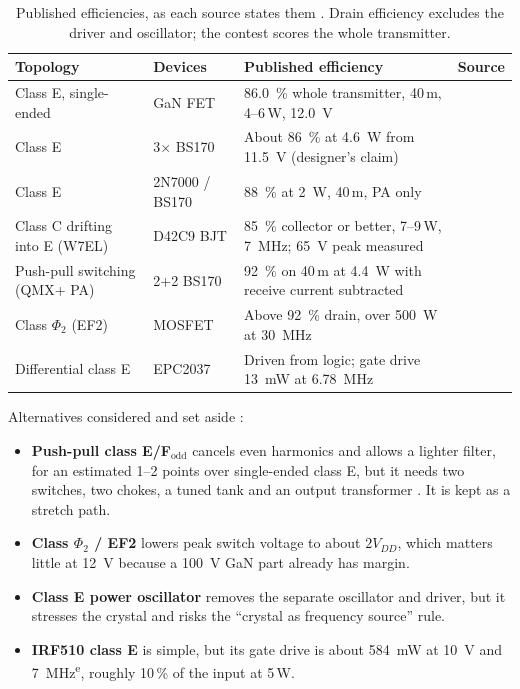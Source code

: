 \documentclass[11pt,letterpaper]{article}
\newcommand{\est}{\textsuperscript{e}}
\begin{document}
\begin{table}[h]
\centering\small
\caption{Published efficiencies, as each source states them \cite{projnotes}. Drain efficiency excludes the driver and oscillator; the contest scores the whole transmitter.}\label{tab:published}
\begin{tabularx}{\textwidth}{@{}L{3.1cm}L{2.4cm}YL{2.6cm}@{}}
\toprule
Topology & Devices & Published efficiency & Source \\ \midrule
Class E, single-ended & GaN FET & \SI{86.0}{\percent} whole transmitter, 40\,m, 4--6\,W, \SI{12.0}{\volt} & \cite{fdim2026winner} \\
Class E & 3$\times$ BS170 & About \SI{86}{\percent} at \SI{4.6}{\watt} from \SI{11.5}{\volt} (designer's claim) & \cite{sovina} \\
Class E & 2N7000 / BS170 & \SI{88}{\percent} at \SI{2}{\watt}, 40\,m, PA only & \cite{tayloe} \\
Class C drifting into E (W7EL) & D42C9 BJT & \SI{85}{\percent} collector or better, 7--9\,W, \SI{7}{\mega\hertz}; \SI{65}{\volt} peak measured & \cite[pp.~2.36, 2.37, 2.40]{emrfd} \\
Push-pull switching (QMX+ PA) & 2+2 BS170 & \SI{92}{\percent} on 40\,m at \SI{4.4}{\watt} with receive current subtracted & \cite{qrplabsqmx} \\
Class $\Phi_2$ (EF2) & MOSFET & Above \SI{92}{\percent} drain, over \SI{500}{\watt} at \SI{30}{\mega\hertz} & \cite{rivas2007} \\
Differential class E & EPC2037 & Driven from logic; gate drive \SI{13}{\milli\watt} at \SI{6.78}{\mega\hertz} & \cite[p.~3]{epcan021} \\
\bottomrule
\end{tabularx}
\end{table}

Alternatives considered and set aside \cite{projnotes}:
\begin{itemize}[nosep]
\item \textbf{Push-pull class E/F$_\text{odd}$} cancels even harmonics and allows a lighter filter, for an estimated 1--2 points over single-ended class E, but it needs two switches, two chokes, a tuned tank and an output transformer \cite{kee2003}. It is kept as a stretch path.
\item \textbf{Class $\Phi_2$ / EF2} lowers peak switch voltage to about $2V_{DD}$, which matters little at \SI{12}{\volt} because a \SI{100}{\volt} GaN part already has margin.
\item \textbf{Class E power oscillator} removes the separate oscillator and driver, but it stresses the crystal and risks the ``crystal as frequency source'' rule.
\item \textbf{IRF510 class E} is simple, but its gate drive is about \SI{584}{\milli\watt} at \SI{10}{\volt} and \SI{7}{\mega\hertz}\est, roughly 10\,\% of the input at 5\,W.
\end{itemize}
\end{document}
